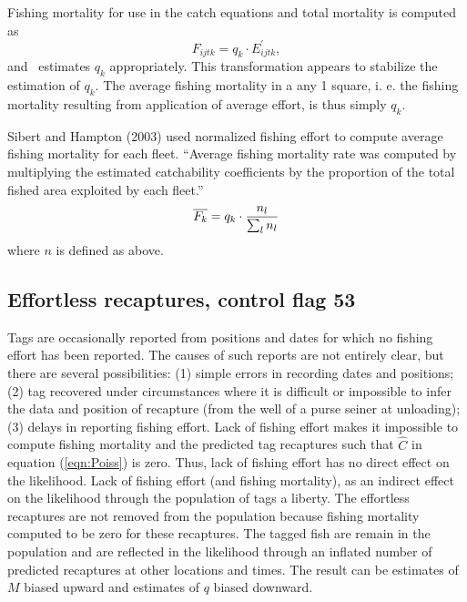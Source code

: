 Fishing mortality for use in the catch equations and total mortality
is computed as
\begin{equation}
F_{ijtk} = q_k \cdot E^{\prime}_{ijtk},
\end{equation}
and \TE\ estimates $q_k$ appropriately.
This transformation appears to stabilize the estimation of $q_k$.
The average fishing mortality in a any 1\deg{} square,
i. e. the fishing mortality resulting from application of average
effort, is thus simply $q_k$.

Sibert and Hampton (2003) used normalized fishing effort to compute
average fishing mortality for each fleet.
``Average fishing mortality rate was computed by
multiplying the estimated catchability coefficients by the proportion
of the total fished area exploited by each fleet.''
\begin{equation}
\overline{F_k} = q_k \cdot\frac{n_l}{\sum_l n_l}
\end{equation}
where $n$ is defined as above.


\subsection*{Effortless recaptures, control flag 53}
Tags are occasionally reported from positions and dates for which no
fishing effort has been reported. The causes of such reports are not
entirely clear, but there are several possibilities: (1) simple errors
in recording dates and positions; (2) tag recovered under circumstances
where it is difficult or impossible to infer the data and position of
recapture (from the well of a purse seiner at unloading); (3) delays
in reporting fishing effort. Lack of fishing effort makes it
impossible to compute fishing mortality and the predicted tag
recaptures such that $\widehat{C}$ in equation (\ref{eqn:Poiss}) is
zero. Thus, lack of fishing effort has no direct effect on the
likelihood. Lack of fishing effort (and fishing mortality), as an
indirect effect on the likelihood through the population of tags a
liberty. The effortless recaptures are not removed from the population
because fishing mortality computed to be zero for these recaptures.
The tagged fish are remain in the population and are reflected in the
likelihood through an inflated number of predicted recaptures at other
locations and times. The result can be estimates of $M$ biased upward
and estimates of $q$ biased downward.


